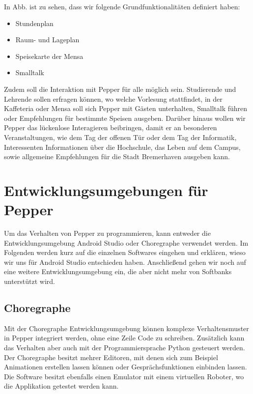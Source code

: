 

In Abb. %
ist zu sehen, dass wir folgende Grundfunktionalitäten definiert haben:

\begin{itemize}
    \item Stundenplan
    \item Raum- und Lageplan
    \item Speisekarte der Mensa
    \item Smalltalk
\end{itemize}

Zudem soll die Interaktion mit Pepper für alle möglich sein. Studierende und Lehrende sollen erfragen können,
wo welche Vorlesung stattfindet, in der Kaffeteria oder Mensa soll sich Pepper mit Gästen unterhalten, Smalltalk führen oder
Empfehlungen für bestimmte Speisen ausgeben. Darüber hinaus wollen wir Pepper das lückenlose Interagieren beibringen, damit er an
besonderen Veranstaltungen, wie dem Tag der offenen Tür oder dem Tag der Informatik, Interessenten Informationen über die Hochschule,
das Leben auf dem Campus, sowie allgemeine Empfehlungen für die Stadt Bremerhaven ausgeben kann.

\section{Entwicklungsumgebungen für Pepper}

Um das Verhalten von Pepper zu programmieren, kann entweder die Entwicklungsumgebung Android Studio oder Choregraphe verwendet werden. 
Im Folgenden werden kurz auf die einzelnen Softwares eingehen und erklären, wieso wir uns für Android Studio entschieden haben. 
Anschließend gehen wir noch auf eine weitere Entwicklungsumgebung ein, die aber nicht mehr von Softbanks unterstützt wird.

\subsection{Choregraphe}

Mit der Choregraphe Entwicklungsumgebung können komplexe Verhaltensmuster in Pepper integriert werden, ohne eine Zeile Code zu schreiben. 
Zusätzlich kann das Verhalten aber auch mit der Programmiersprache Python gesteuert werden. Der Choregraphe besitzt mehrer Editoren, 
mit denen sich zum Beispiel Animationen erstellen lassen können oder Gesprächsfunktionen einbinden lassen. Die Software besitzt ebenfalls 
einen Emulator mit einem virtuellen Roboter, wo die Applikation getestet werden kann.
\cite{Choregraphe}


